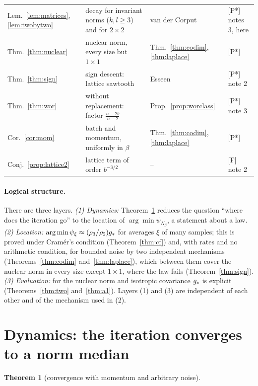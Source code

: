 \documentclass[10pt]{article}
\newtheorem{theorem}{Theorem}
\theoremstyle{definition}
\theoremstyle{remark}
\newcommand{\status}[1]{\textsf{\small[#1]}}
\begin{document}
{\begin{longtable}{@{}p{}p{}p{}p{}@{}}
Lem.~\ref{lem:matrices}, \ref{lem:twobytwo} & decay for invariant norms ($k,l\ge3$) and for $2\times2$ & van der Corput \citep{stein} & \status{P*} notes 3, here\\
Thm.~\ref{thm:nuclear} & nuclear norm, every size but $1\times1$ & Thm.~\ref{thm:codim}, \ref{thm:laplace} & \status{P*}\\
Thm.~\ref{thm:sign} & sign descent: lattice sawtooth & Esseen \citep{esseen,gk} & \status{P*} note 2\\
Thm.~\ref{thm:wor} & without replacement: factor $\frac{n-2b}{n-2}$ & Prop.~\ref{prop:worclass} & \status{P*} note 3\\
Cor.~\ref{cor:mom} & batch and momentum, uniformly in $\beta$ & Thm.~\ref{thm:codim}, \ref{thm:laplace} & \status{P*}\\
Conj.~\ref{prop:lattice2} & lattice term of order $b^{-3/2}$ & -- & \status{F} note 2\\
\bottomrule
\end{longtable}}

\paragraph{Logical structure.} There are three layers. \emph{(1) Dynamics:} Theorem~\ref{thm:conv} reduces the question
``where does the iteration go'' to the location of $\arg\min\psi_{N_\beta}$, a statement about a law. \emph{(2) Location:}
$\arg\min\psi_{\xi}\approx(\rho_3/\rho_2)g_\ast$ for averages $\xi$ of many samples; this is proved under Cram\'er's
condition (Theorem~\ref{thm:cf}) and, with rates and no arithmetic condition, for bounded noise by two independent
mechanisms (Theorems~\ref{thm:codim} and~\ref{thm:laplace}), which between them cover the nuclear norm in every size
except $1\times1$, where the law fails (Theorem~\ref{thm:sign}). \emph{(3) Evaluation:} for the nuclear norm and isotropic
covariance $g_\ast$ is explicit (Theorems~\ref{thm:two} and~\ref{thm:a1}). Layers (1) and (3) are independent of each other
and of the mechanism used in (2).

\section{Dynamics: the iteration converges to a norm median}\label{sec:dyn}

\begin{theorem}[convergence with momentum and arbitrary noise]\label{thm:conv}\StmtConv\end{theorem}

\end{document}
